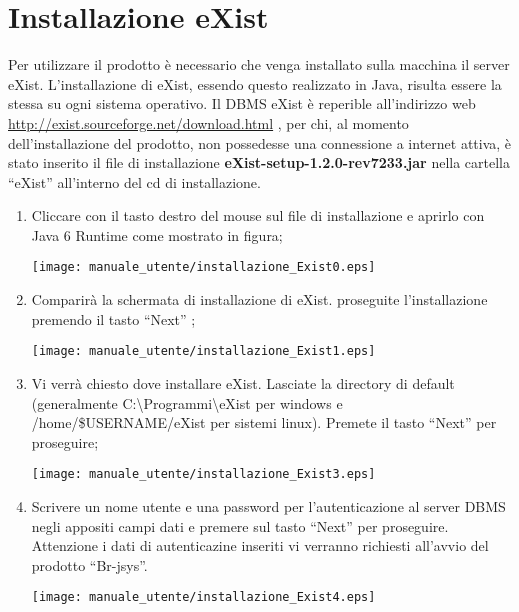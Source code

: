 \section{Installazione eXist}
Per utilizzare il prodotto \`e necessario che venga installato sulla macchina il server eXist. L'installazione di eXist, essendo questo realizzato in Java, risulta essere la stessa su ogni sistema operativo.
Il DBMS eXist \`e reperible all'indirizzo web \href{http://exist.sourceforge.net/download.html}{http://exist.sourceforge.net/download.html} , per chi, al momento dell'installazione del prodotto, non possedesse una connessione a internet attiva, \`e stato inserito il file di installazione \textbf{eXist-setup-1.2.0-rev7233.jar} nella cartella ``eXist'' all'interno del cd di installazione.
\begin{enumerate}
\item Cliccare con il tasto destro del mouse sul file di installazione e aprirlo con Java 6 Runtime come mostrato in figura;
\begin{center}
\texttt{[image: manuale\_utente/installazione\_Exist0.eps]}\\
\end{center}
\item Comparir\`a la schermata di installazione di eXist. proseguite l'installazione premendo il tasto ``Next'' ;
\begin{center}
\texttt{[image: manuale\_utente/installazione\_Exist1.eps]}\\
\end{center}
\item Vi verr\`a chiesto dove installare eXist. Lasciate la directory di default (generalmente C:\textbackslash Programmi\textbackslash eXist per windows e  /home/\$USERNAME/eXist per sistemi linux). Premete il tasto ``Next'' per proseguire;
\begin{center}
\texttt{[image: manuale\_utente/installazione\_Exist3.eps]}\\
\end{center}
\item Scrivere un nome utente e una password per l'autenticazione al server DBMS negli appositi campi dati e premere sul tasto ``Next'' per proseguire. Attenzione i dati di autenticazine inseriti vi verranno richiesti all'avvio del prodotto ``Br-jsys''.
\begin{center}
\texttt{[image: manuale\_utente/installazione\_Exist4.eps]}\\
\end{center}

\end{enumerate}
